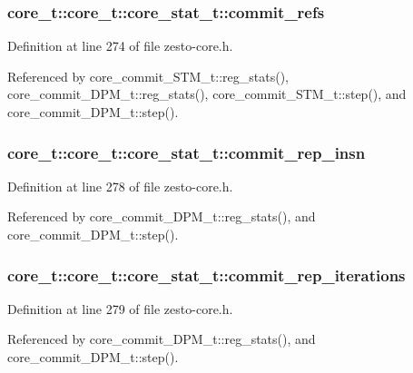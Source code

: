 \subsubsection[{commit\_\-refs}]{ core\_\-t::core\_\-t::core\_\-stat\_\-t::commit\_\-refs}\label{structcore__t_1_1core__stat__t_f7dad952fb9b6af8fa5e7bd24f793c7c}




Definition at line 274 of file zesto-core.h.

Referenced by core\_\-commit\_\-STM\_\-t::reg\_\-stats(), core\_\-commit\_\-DPM\_\-t::reg\_\-stats(), core\_\-commit\_\-STM\_\-t::step(), and core\_\-commit\_\-DPM\_\-t::step().
\subsubsection[{commit\_\-rep\_\-insn}]{ core\_\-t::core\_\-t::core\_\-stat\_\-t::commit\_\-rep\_\-insn}\label{structcore__t_1_1core__stat__t_6ed6d4bf6827a4b7f5f947ee1fe06461}




Definition at line 278 of file zesto-core.h.

Referenced by core\_\-commit\_\-DPM\_\-t::reg\_\-stats(), and core\_\-commit\_\-DPM\_\-t::step().
\subsubsection[{commit\_\-rep\_\-iterations}]{ core\_\-t::core\_\-t::core\_\-stat\_\-t::commit\_\-rep\_\-iterations}\label{structcore__t_1_1core__stat__t_5fde43047a0bf209409fd84fea291cb7}




Definition at line 279 of file zesto-core.h.

Referenced by core\_\-commit\_\-DPM\_\-t::reg\_\-stats(), and core\_\-commit\_\-DPM\_\-t::step().
